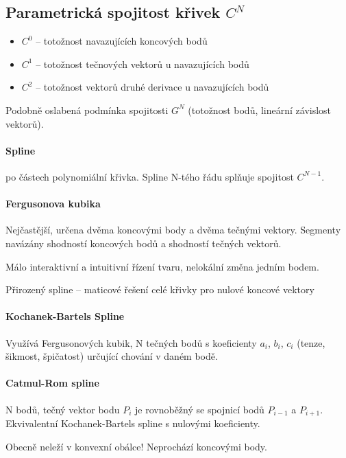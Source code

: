 \documentclass[a4paper, 11pt]{report}
\begin{document}
\subsection{Parametrická spojitost křivek $C^N$}
\begin{itemize}	
	\item $C^0$ -- totožnost navazujících koncových bodů
	\item $C^1$ -- totožnost tečnových vektorů u navazujících bodů
	\item $C^2$ -- totožnost vektorů druhé derivace u navazujících bodů
\end{itemize}

Podobně oslabená podmínka spojitosti $G^N$ (totožnost bodů, lineární závislost vektorů).

\paragraph{Spline} po částech polynomiální křivka. Spline N-tého řádu splňuje spojitost $C^{N-1}$.

\paragraph{Fergusonova kubika} Nejčastější, určena dvěma koncovými body a dvěma tečnými vektory. Segmenty navázány shodností koncových bodů a shodností tečných vektorů.

Málo interaktivní a intuitivní řízení tvaru, nelokální změna jedním bodem.

Přirozený spline -- maticové řešení celé křivky pro nulové koncové vektory

\paragraph{Kochanek-Bartels Spline}

Využívá Fergusonových kubik, N tečných bodů s koeficienty $a_i$, $b_i$, $c_i$ (tenze, šikmost, špičatost) určující chování v daném bodě.

\paragraph{Catmul-Rom spline}

N bodů, tečný vektor bodu $P_i$ je rovnoběžný se spojnicí bodů $P_{i-1}$ a $P_{i+1}$. Ekvivalentní Kochanek-Bartels spline s nulovými koeficienty.

Obecně neleží v konvexní obálce! Neprochází koncovými body.
\end{document}
